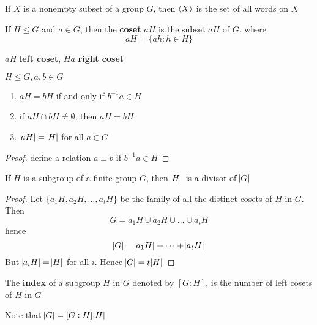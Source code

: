 \documentclass[11pt]{article}
\begin{document}
\begin{proposition}[]
If \(X\) is a nonempty subset of a group \(G\), then \(\langle X\rangle\) is the set of all
words on \(X\)
\end{proposition}


\begin{definition}[]
If \(H\le G\) and \(a\in G\), then the \textbf{coset} \(aH\) is the subset \(aH\) of \(G\),
where
\begin{equation*}
aH=\{ah:h\in H\}
\end{equation*}
\end{definition}
\(aH\) \textbf{left coset}, \(Ha\) \textbf{right coset}

\begin{lemma}[]
\(H\le G,a,b\in G\)
\begin{enumerate}
\item \(aH=bH\) if and only if \(b^{-1}a\in H\)
\item if \(aH\cap bH\neq\emptyset\), then \(aH=bH\)
\item \(\abs{aH}=\abs{H}\) for all \(a\in G\)
\end{enumerate}
\end{lemma}
\begin{proof}
define a relation \(a\equiv b\) if \(b^{-1}a\in H\)
\end{proof}


\begin{theorem}
If \(H\) is a subgroup of a finite group \(G\), then \(\abs{H}\) is a divisor of \(\abs{G}\)
\end{theorem}

\begin{proof}
Let \(\{a_1H,a_2H,\dots,a_tH\}\) be the family of all the distinct cosets of
\(H\) in \(G\). Then
\begin{equation*}
G=a_1H\cup a_2H\cup\dots\cup a_tH
\end{equation*}
hence
\begin{equation*}
\abs{G}=\abs{a_1H}+\dots+\abs{a_tH}
\end{equation*}
But \(\abs{a_iH}=\abs{H}\) for all \(i\). Hence \(\abs{G}=t\abs{H}\)
\end{proof}

\begin{definition}[]
The \textbf{index} of a subgroup \(H\) in \(G\) denoted by \([G:H]\), is the number of
left cosets of \(H\) in \(G\)
\end{definition}

Note that \(\abs{G}=[G:H]\abs{H}\)
\end{document}
